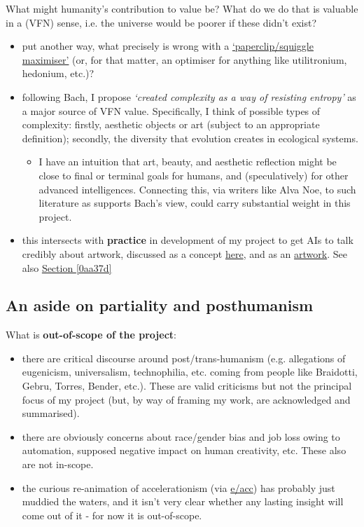 \documentclass{article}
\begin{document}
\label{bd3c7f}

What might humanity's contribution to value be? What do we do that is valuable in a (VFN) sense, i.e. the universe would be poorer if these didn't exist?
\begin{itemize}
\item put another way, what precisely is wrong with a \href{https://www.lesswrong.com/tag/squiggle-maximizer-formerly-paperclip-maximizer}{`paperclip/squiggle maximiser'} (or, for that matter, an optimiser for anything like utilitronium, hedonium, etc.)?
\item following Bach, I propose \textit{`created complexity as a way of resisting entropy'} as a major source of VFN value.  Specifically, I think of possible types of complexity: firstly, aesthetic objects or art (subject to an appropriate definition); secondly, the diversity that evolution creates in ecological systems.
\begin{itemize}
\item I have an intuition that art, beauty, and aesthetic reflection might be close to final or terminal goals for humans, and (speculatively) for other advanced intelligences.  Connecting this, via writers like Alva Noe, to such literature as supports Bach's view, could carry substantial weight in this project.
\end{itemize}
\item this intersects with \textbf{practice} in development of my project to get AIs to talk credibly about artwork, discussed as a concept \href{https://tripleampersand.org/work-art-age-cybernetic-criticism/}{here}, and as an \href{http://ukc10014.org/fixedp.html}{artwork}. See also \hyperref[0aa37d]{Section \ref*{0aa37d}}
\end{itemize}

\subsection{An aside on partiality and posthumanism}

\label{b70b68}

What is \textbf{out-of-scope of the project}: 
\begin{itemize}
\item there are critical discourse around post/trans-humanism (e.g. allegations of eugenicism, universalism, technophilia, etc. coming from people like Braidotti, Gebru, Torres, Bender, etc.).  These are valid criticisms but not the principal focus of my project (but, by way of framing my work, are acknowledged and summarised).
\item there are obviously concerns about race/gender bias and job loss owing to automation, supposed negative impact on human creativity, etc.  These also are not in-scope.
\item the curious re-animation of  accelerationism (via \href{https://en.wikipedia.org/wiki/Effective_accelerationism}{e/acc}) has probably just muddied the waters, and it isn't very clear whether any lasting insight will come out of it - for now it is out-of-scope.
\end{itemize}
\end{document}
